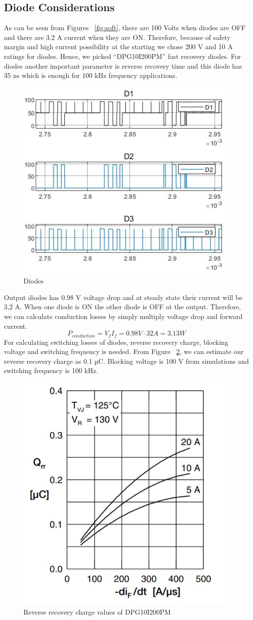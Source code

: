 \documentclass{article}
\begin{document}
\subsection{Diode Considerations}
As can be seen from Figures ~\ref{fig:soft}, there are 100 Volts when diodes are OFF and there are 3.2 A current when they are ON. Therefore, because of safety margin and high current possibility at the starting we chose 200 V and 10 A ratings for diodes. Hence, we picked “DPG10I200PM” \cite{diode} fast recovery diodes. For diodes another important parameter is reverse recovery time and this diode has 35 ns which is enough for 100 kHz frequency applications.
\begin{figure}[H]
    \centering
    \includegraphics[width=0.5\linewidth]{diodes.jpg}
    \caption {Diodes}
    \label{fig:diodes}
\end{figure}
Output diodes has 0.98 V voltage drop and at steady state their current will be 3,2 A. When one diode is ON the other diode is OFF at the output. Therefore, we can calculate conduction losses by simply multiply voltage drop and forward current.
\begin{equation}
    P_{conduction}=V_fI_f=0.98V\cdot 32A=3.13 W
\end{equation}
For calculating switching losses of diodes, reverse recovery charge, blocking voltage and switching frequency is needed. From Figure ~\ref{fig:diode_loss}, we can estimate our reverse recovery charge as 0.1 µC. Blocking voltage is 100 V from simulations and switching frequency is 100 kHz.
\begin{figure}[H]
    \centering
    \includegraphics[width=0.5\linewidth]{diode_loss.jpeg}
    \caption {Reverse recovery charge values of DPG10I200PM}
    \label{fig:diode_loss}
\end{figure}
\end{document}
